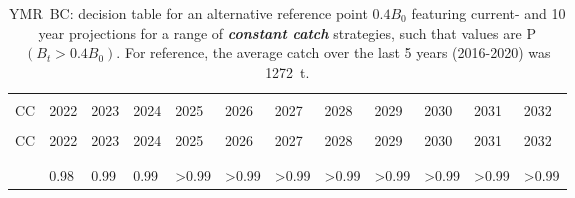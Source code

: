 \documentclass[11pt]{book}
\newcommand{\itbf}[1]{\textit{\textbf{#1}}}
\begin{document}
\begin{longtable}[c]{>{\raggedright\let\newline\\\arraybackslash\hspace{0pt}}p{0.48in}>{\raggedleft\let\newline\\\arraybackslash\hspace{0pt}}p{0.48in}>{\raggedleft\let\newline\\\arraybackslash\hspace{0pt}}p{0.48in}>{\raggedleft\let\newline\\\arraybackslash\hspace{0pt}}p{0.48in}>{\raggedleft\let\newline\\\arraybackslash\hspace{0pt}}p{0.51in}>{\raggedleft\let\newline\\\arraybackslash\hspace{0pt}}p{0.51in}>{\raggedleft\let\newline\\\arraybackslash\hspace{0pt}}p{0.51in}>{\raggedleft\let\newline\\\arraybackslash\hspace{0pt}}p{0.51in}>{\raggedleft\let\newline\\\arraybackslash\hspace{0pt}}p{0.51in}>{\raggedleft\let\newline\\\arraybackslash\hspace{0pt}}p{0.51in}>{\raggedleft\let\newline\\\arraybackslash\hspace{0pt}}p{0.51in}>{\raggedleft\let\newline\\\arraybackslash\hspace{0pt}}p{0.51in}}
  \caption{YMR~BC: decision table for an alternative reference point $0.4 B_0$ featuring current- and 10 year projections for a range of \itbf{constant catch} strategies, such that values are P$(B_t > 0.4 B_0)$.  For reference, the average catch over the last 5 years (2016-2020) was 1272~t. } \label{tab:ymr.gmu.40B0.CCs}\\  \hline\\[-2.2ex]  CC  & 2022 & 2023 & 2024 & 2025 & 2026 & 2027 & 2028 & 2029 & 2030 & 2031 & 2032 \\[0.2ex]\hline\\[-1.5ex]  \endfirsthead   \hline  CC  & 2022 & 2023 & 2024 & 2025 & 2026 & 2027 & 2028 & 2029 & 2030 & 2031 & 2032 \\[0.2ex]\hline\\[-1.5ex]  \endhead  \hline\\[-2.2ex]   \endfoot  \hline \endlastfoot  0 & 0.98 & 0.99 & 0.99 & >0.99 & >0.99 & >0.99 & >0.99 & >0.99 & >0.99 & >0.99 & >0.99 \\ 

\end{longtable}
\end{document}

